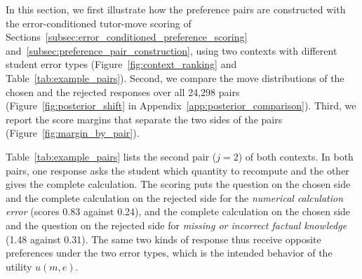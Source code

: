 
In this section, we first illustrate how the preference pairs are constructed with the error-conditioned tutor-move scoring of Sections~\ref{subsec:error_conditioned_preference_scoring} and~\ref{subsec:preference_pair_construction}, using two contexts with different student error types (Figure~\ref{fig:context_ranking} and Table~\ref{tab:example_pairs}). Second, we compare the move distributions of the chosen and the rejected responses over all 24,298 pairs (Figure~\ref{fig:posterior_shift} in Appendix~\ref{app:posterior_comparison}). Third, we report the score margins that separate the two sides of the pairs (Figure~\ref{fig:margin_by_pair}).

Table~\ref{tab:example_pairs} lists the second pair (\(j = 2\)) of both contexts. In both pairs, one response asks the student which quantity to recompute and the other gives the complete calculation. The scoring puts the question on the chosen side and the complete calculation on the rejected side for the \textit{numerical calculation error} (scores 0.83 against 0.24), and the complete calculation on the chosen side and the question on the rejected side for \textit{missing or incorrect factual knowledge} (1.48 against 0.31). The same two kinds of response thus receive opposite preferences under the two error types, which is the intended behavior of the utility \(u(m,e)\).

